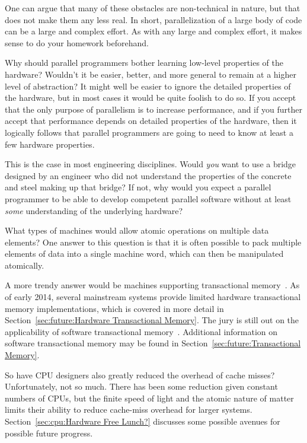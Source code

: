 	One can argue that many of these obstacles are non-technical
	in nature, but that does not make them any less real.
	In short, parallelization of a large body of code
	can be a large and complex effort.
	As with any large and complex effort, it makes sense to
	do your homework beforehand.

\QuickQ{}
	Why should parallel programmers bother learning low-level
	properties of the hardware?
	Wouldn't it be easier, better, and more general to remain at
	a higher level of abstraction?
\QuickA{}
	It might well be easier to ignore the detailed properties of
	the hardware, but in most cases it would be quite foolish
	to do so.
	If you accept that the only purpose of parallelism is to
	increase performance, and if you further accept that
	performance depends on detailed properties of the hardware,
	then it logically follows that parallel programmers are going
	to need to know at least a few hardware properties.

	This is the case in most engineering disciplines.
	Would \emph{you} want to use a bridge designed by an
	engineer who did not understand the properties of
	the concrete and steel making up that bridge?
	If not, why would you expect a parallel programmer to be
	able to develop competent parallel software without at least
	\emph{some} understanding of the underlying hardware?

\QuickQ{}
	What types of machines would allow atomic operations on
	multiple data elements?
\QuickA{}
	One answer to this question is that it is often possible to
	pack multiple elements of data into a single machine word,
	which can then be manipulated atomically.

	A more trendy answer would be machines supporting transactional
	memory~\cite{DBLomet1977SIGSOFT}.
	As of early 2014, several mainstream systems provide limited
	hardware transactional memory implementations, which is covered
	in more detail in
	Section~\ref{sec:future:Hardware Transactional Memory}.
	The jury is still out on the applicability of software transactional
	memory~\cite{McKenney2007PLOSTM,DonaldEPorter2007TRANSACT,
	ChistopherJRossbach2007a,CalinCascaval2008tmtoy,
	AleksandarDragovejic2011STMnotToy,AlexanderMatveev2012PessimisticTM}.
	Additional information on software transactional memory may be
	found in
	Section~\ref{sec:future:Transactional Memory}.

\QuickQ{}
	So have CPU designers also greatly reduced the overhead of
	cache misses?
\QuickA{}
	Unfortunately, not so much.
	There has been some reduction given constant numbers of CPUs,
	but the finite speed of light and the atomic nature of
	matter limits their ability to reduce cache-miss overhead
	for larger systems.
	Section~\ref{sec:cpu:Hardware Free Lunch?}
	discusses some possible avenues for possible future progress.

